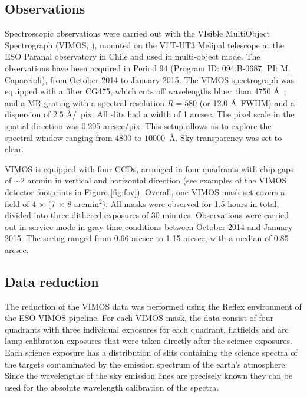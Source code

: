 \documentclass[useAMS,usenatbib]{mn2e}
\begin{document}
\subsection{Observations}
\label{sec:observations}

Spectroscopic observations were carried out with the VIsible MultiObject Spectrograph (VIMOS, \citealt{LeFevre}), mounted on the VLT-UT3 Melipal telescope at the ESO Paranal observatory in Chile and used in multi-object mode. The observations have been acquired in Period 94 (Program ID: 094.B-0687, PI: M. Capaccioli), from October 2014 to January 2015. 
The VIMOS spectrograph was equipped with a filter CG475, which cuts off wavelengths bluer than 4750 \AA\ , and a MR grating with a spectral resolution $R = 580$ (or 12.0 \AA\ FWHM) 
and a dispersion of $2.5$ \AA /~pix. All slits had a width of 1 arcsec. The pixel scale in the spatial direction was 0.205 arcsec/pix. This setup allows us to explore the spectral window ranging from $4800$ to $10000$~\AA. Sky transparency was set to clear.

VIMOS is equipped with four CCDs, arranged in four quadrants with chip gaps of $\sim$2 arcmin in vertical and horizontal direction (see examples of the VIMOS detector footprints in Figure \ref{fig:fov}). Overall, one VIMOS mask set covers a field of 4 $\times$ (7 $\times$ 8 arcmin$^2$). All masks were observed for 1.5 hours in total, divided into three dithered exposures of 30 minutes. Observations were carried out in service mode in gray-time conditions between October 2014 and January 2015. The seeing ranged from 0.66 arcsec to 1.15 arcsec, with a median of 0.85 arcsec. 

\subsection{Data reduction}

The reduction of the VIMOS data was performed using the Reflex 
environment \citep{Freudling13} of the ESO VIMOS pipeline. 
For each VIMOS mask, the data consist of four 
quadrants with three individual exposures for each quadrant, flatfields and
arc lamp calibration exposures that were taken directly after the science 
exposures. Each science exposure has a distribution of slits containing the 
science spectra of the targets contaminated by the emission spectrum of the 
earth's atmosphere. Since the wavelengths of the sky emission lines are 
precisely known they can be used for the absolute wavelength calibration of 
the spectra.
\end{document}
